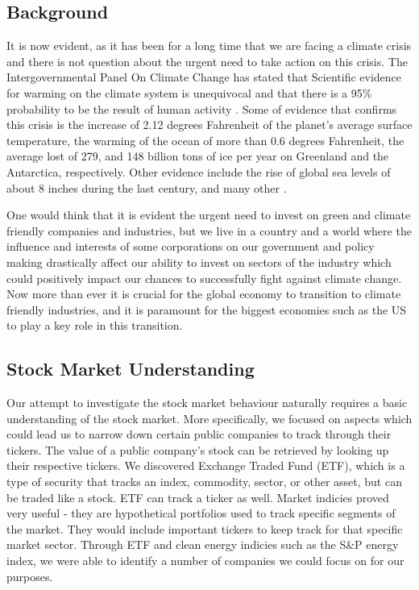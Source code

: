\documentclass[sigconf, nonacm]{acmart}
\begin{document}
\subsection{Background}
\begin{flushleft}
It is now evident, as it has been for a long time that we are facing a climate crisis and there is not question about the urgent need to take action on this crisis. The Intergovernmental Panel On Climate Change has stated that Scientific evidence for warming on the climate system is unequivocal and that there is a 95\% probability to be the result of human activity \cite{nasa_2021}.  Some of evidence that confirms this crisis is the increase of 2.12 degrees Fahrenheit  of the planet's average surface temperature, the warming of the ocean of more than 0.6 degrees Fahrenheit, the average lost of 279, and 148 billion tons of ice per year on Greenland and the Antarctica, respectively. Other evidence include the rise of global sea levels of about 8 inches during the last century, and many other  \cite{nasa_2021}.
\end{flushleft}

\begin{flushleft}
One would think that it is evident the urgent need to invest on green and climate friendly companies and industries, but we live in a country and a world where the influence and interests of some corporations on our government and policy making drastically affect our ability to invest on sectors of the industry which could positively impact our chances to successfully fight against climate change. Now more than ever it is crucial for the global economy to transition to climate friendly industries, and it is paramount for the biggest economies such as the US to play a key role in this transition. 
\end{flushleft}


\subsection{Stock Market Understanding}
Our attempt to investigate the stock market behaviour naturally requires a basic understanding of the stock market. More specifically, we focused on aspects which could lead us to narrow down certain public companies to track through their tickers. The value of a public company's stock can be retrieved by looking up their respective tickers. We discovered Exchange Traded Fund (ETF), which is a type of security that tracks an index, commodity, sector, or other asset, but can be traded like a stock. ETF can track a ticker as well. Market indicies proved very useful - they are hypothetical portfolios used to track specific segments of the market. They would include important tickers to keep track for that specific market sector. Through ETF and clean energy indicies such as the S\&P energy index, we were able to identify a number of companies we could focus on for our purposes.
\end{document}

